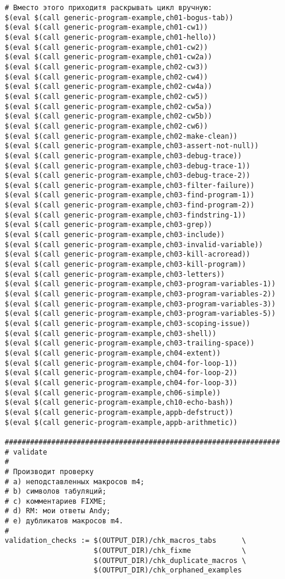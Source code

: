 \begin{verbatim}
# Вместо этого приходитя раскрывать цикл вручную:
$(eval $(call generic-program-example,ch01-bogus-tab))
$(eval $(call generic-program-example,ch01-cw1))
$(eval $(call generic-program-example,ch01-hello))
$(eval $(call generic-program-example,ch01-cw2))
$(eval $(call generic-program-example,ch01-cw2a))
$(eval $(call generic-program-example,ch02-cw3))
$(eval $(call generic-program-example,ch02-cw4))
$(eval $(call generic-program-example,ch02-cw4a))
$(eval $(call generic-program-example,ch02-cw5))
$(eval $(call generic-program-example,ch02-cw5a))
$(eval $(call generic-program-example,ch02-cw5b))
$(eval $(call generic-program-example,ch02-cw6))
$(eval $(call generic-program-example,ch02-make-clean))
$(eval $(call generic-program-example,ch03-assert-not-null))
$(eval $(call generic-program-example,ch03-debug-trace))
$(eval $(call generic-program-example,ch03-debug-trace-1))
$(eval $(call generic-program-example,ch03-debug-trace-2))
$(eval $(call generic-program-example,ch03-filter-failure))
$(eval $(call generic-program-example,ch03-find-program-1))
$(eval $(call generic-program-example,ch03-find-program-2))
$(eval $(call generic-program-example,ch03-findstring-1))
$(eval $(call generic-program-example,ch03-grep))
$(eval $(call generic-program-example,ch03-include))
$(eval $(call generic-program-example,ch03-invalid-variable))
$(eval $(call generic-program-example,ch03-kill-acroread))
$(eval $(call generic-program-example,ch03-kill-program))
$(eval $(call generic-program-example,ch03-letters))
$(eval $(call generic-program-example,ch03-program-variables-1))
$(eval $(call generic-program-example,ch03-program-variables-2))
$(eval $(call generic-program-example,ch03-program-variables-3))
$(eval $(call generic-program-example,ch03-program-variables-5))
$(eval $(call generic-program-example,ch03-scoping-issue))
$(eval $(call generic-program-example,ch03-shell))
$(eval $(call generic-program-example,ch03-trailing-space))
$(eval $(call generic-program-example,ch04-extent))
$(eval $(call generic-program-example,ch04-for-loop-1))
$(eval $(call generic-program-example,ch04-for-loop-2))
$(eval $(call generic-program-example,ch04-for-loop-3))
$(eval $(call generic-program-example,ch06-simple))
$(eval $(call generic-program-example,ch10-echo-bash))
$(eval $(call generic-program-example,appb-defstruct))
$(eval $(call generic-program-example,appb-arithmetic))

#################################################################
# validate
#
# Производит проверку
# a) неподставленных макросов m4;
# b) символов табуляций;
# c) комментариев FIXME;
# d) RM: мои ответы Andy;
# e) дубликатов макросов m4.
#
validation_checks := $(OUTPUT_DIR)/chk_macros_tabs      \
                     $(OUTPUT_DIR)/chk_fixme            \
                     $(OUTPUT_DIR)/chk_duplicate_macros \
                     $(OUTPUT_DIR)/chk_orphaned_examples


\end{verbatim}
